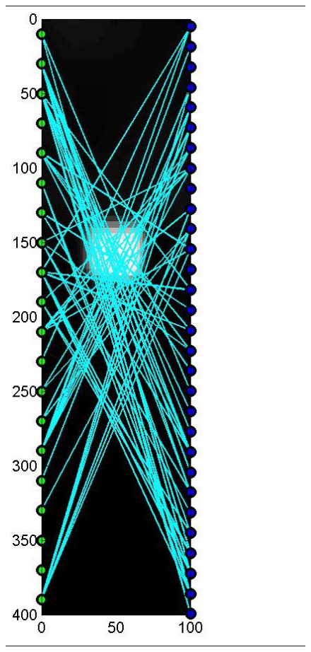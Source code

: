 \documentclass[11pt]{article}
\begin{document}
{\begin{figure}[!h]
\begin{center}
\begin{tabular}{|c|c|c|c|c|c|c|c|c|}
			\includegraphics[width=.9\iwidth]{figures/newFigs/noisy/resultsExp-3-designs}
			&

\end{tabular}
\end{center}
\end{figure}}
\end{document}
